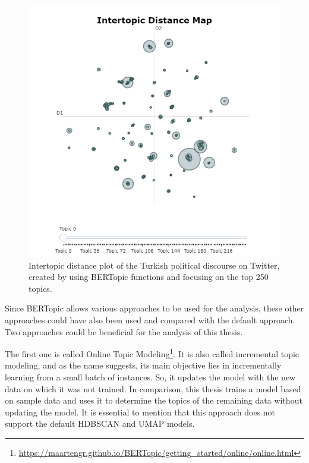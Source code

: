 
\begin{figure}[h!]
    \centering
    \includegraphics[width=0.75\linewidth]{figures/intertopic_distance_plot.png}
    \caption[BERTopic's intertopic distance plot]
    {Intertopic distance plot of the Turkish political discourse on Twitter, created by using BERTopic
    functions and focusing on the top 250 topics.}\label{fig:intertopic_distance_plot}
\end{figure}

Since BERTopic allows various approaches to be used for the analysis, these other approaches could 
have also been used and compared with the default approach. Two approaches could be beneficial for 
the analysis of this thesis. 

The first one is called Online Topic 
Modeling\footnote{\url{https://maartengr.github.io/BERTopic/getting_started/online/online.html}}. It 
is also called incremental topic modeling, and as the name suggests, its main objective lies in 
incrementally learning from a small batch of instances. So, it updates the model with the new data 
on which it was not trained. In comparison, this thesis trains a model based on sample data and 
uses it to determine the topics of the remaining data without updating the model. It is essential 
to mention that this approach does not support the default HDBSCAN and UMAP models.
 
